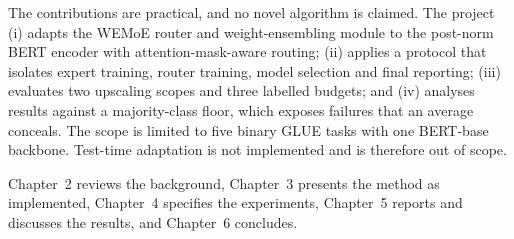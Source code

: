 The contributions are practical, and no novel algorithm is claimed. The project (i) adapts the WEMoE router and weight-ensembling module to the post-norm BERT encoder with attention-mask-aware routing; (ii) applies a protocol that isolates expert training, router training, model selection and final reporting; (iii) evaluates two upscaling scopes and three labelled budgets; and (iv) analyses results against a majority-class floor, which exposes failures that an average conceals. The scope is limited to five binary GLUE tasks with one BERT-base backbone. Test-time adaptation is not implemented and is therefore out of scope.

Chapter~2 reviews the background, Chapter~3 presents the method as implemented, Chapter~4 specifies the experiments, Chapter~5 reports and discusses the results, and Chapter~6 concludes.